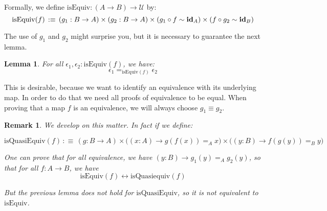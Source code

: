 \documentclass{article}
\newcommand{\U}{{\mathcal U}}
\renewcommand{\r}{\rightarrow}
\newcommand{\id}{\mathrm{\bf id}}
\newtheorem{lemma}{Lemma}
\newtheorem{remark}{Remark}
\begin{document}
Formally, we define $\mathrm{isEquiv} : (A \r B)\r \U$ by:
\[\mathrm{isEquiv}(f) \, :\equiv\, (g_1:B\r A)\times (g_2:B\r A)\times (g_1\circ f \sim \id_A) \times (f\circ g_2 \sim \id_B)\]



The use of $g_1$ and $g_2$ might surprise you, but it is necessary to guarantee the next lemma.



\begin{lemma}
For all $\epsilon_1,\epsilon_2:\mathrm{isEquiv}(f)$, we have:
\[\epsilon_1 =_{\mathrm{isEquiv}(f)} \epsilon_2\]
\end{lemma}

This is desirable, because we want to identify an equivalence with its underlying map. In order to do that we need all proofs of equivalence to be equal. %
When proving that a map $f$ is an equivalence, we will always choose $g_1 \equiv g_2$.

\begin{remark}
We develop on this matter. In fact if we define:

\[\mathrm{isQuasiEquiv}(f) \, :\equiv\, (g:B\r A)\times \big((x:A)\r g(f(x))=_A x \big)\times\big((y:B)\r f(g(y)) =_B y\big)\]

One can prove that for all equivalence, we have $(y:B)\r g_1(y) =_A g_2(y)$, so that for all $f:A\r B$, we have 
\[\mathrm{isEquiv}(f) \leftrightarrow \mathrm{isQuasiequiv}(f)\]

But the  previous lemma does not hold for $\mathrm{isQuasiEquiv}$, so it is not equivalent to $\mathrm{isEquiv}$. %
\end{remark}



\end{document}
